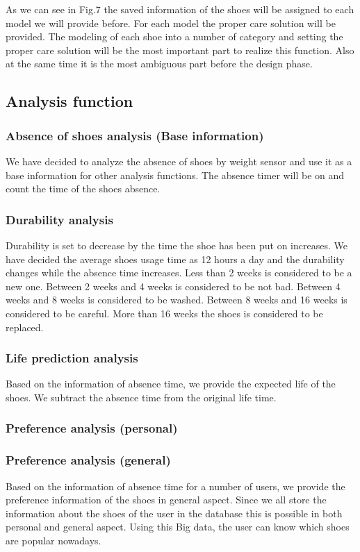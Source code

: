 \documentclass[conference]{IEEEtran}
\begin{document}
As we can see in Fig.7 the saved information of the shoes will be assigned to each model we will provide before. For each model the proper care solution will be provided. 
The modeling of each shoe into a number of category and setting the proper care solution will be the most important part to realize this function. Also at the same time it is the most ambiguous part before the design phase.



\subsection{Analysis function}
\subsubsection{Absence of shoes analysis (Base information)}
We have decided to analyze the absence of shoes by weight sensor and use it as a base information for other analysis functions. The absence timer will be on and count the time of the shoes absence.

\subsubsection{Durability analysis}
Durability is set to decrease by the time the shoe has been put on increases. We have decided the average shoes usage time as 12 hours a day and the durability changes while the absence time increases. Less than 2 weeks is considered to be a new one. Between 2 weeks and 4 weeks is considered to be not bad. 
Between 4 weeks and 8 weeks is considered to be washed. Between 8 weeks and 16 weeks is considered to be careful. More than 16 weeks the shoes is considered to be replaced.

\subsubsection{Life prediction analysis}
Based on the information of absence time, we provide the expected  life of the shoes. We subtract the absence time from the original life time.

\subsubsection{Preference analysis (personal)}
\subsubsection{Preference analysis (general)}
Based on the information of absence time for a number of users, we provide the preference information of the shoes in general aspect. Since we all store the information about the shoes of the user in the database this is possible in both personal and general aspect. Using this Big data, the user can know which shoes are popular nowadays.
\end{document}
